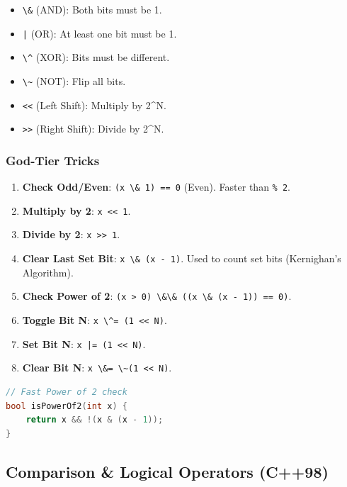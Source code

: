 \begin{itemize}
\tightlist
\item
  \passthrough{\lstinline!\&!} (AND): Both bits must be 1.
\item
  \passthrough{\lstinline!|!} (OR): At least one bit must be 1.
\item
  \passthrough{\lstinline!\^!} (XOR): Bits must be different.
\item
  \passthrough{\lstinline!\~!} (NOT): Flip all bits.
\item
  \passthrough{\lstinline!<<!} (Left Shift): Multiply by 2\^{}N.
\item
  \passthrough{\lstinline!>>!} (Right Shift): Divide by 2\^{}N.
\end{itemize}

\hypertarget{god-tier-tricks}{%
\subsubsection{God-Tier Tricks}\label{god-tier-tricks}}

\begin{enumerate}
\def\labelenumi{\arabic{enumi}.}
\tightlist
\item
  \textbf{Check Odd/Even}: \passthrough{\lstinline!(x \& 1) == 0!}
  (Even). Faster than \passthrough{\lstinline!\% 2!}.
\item
  \textbf{Multiply by 2}: \passthrough{\lstinline!x << 1!}.
\item
  \textbf{Divide by 2}: \passthrough{\lstinline!x >> 1!}.
\item
  \textbf{Clear Last Set Bit}: \passthrough{\lstinline!x \& (x - 1)!}.
  Used to count set bits (Kernighan's Algorithm).
\item
  \textbf{Check Power of 2}:
  \passthrough{\lstinline!(x > 0) \&\& ((x \& (x - 1)) == 0)!}.
\item
  \textbf{Toggle Bit N}: \passthrough{\lstinline!x \^= (1 << N)!}.
\item
  \textbf{Set Bit N}: \passthrough{\lstinline!x |= (1 << N)!}.
\item
  \textbf{Clear Bit N}: \passthrough{\lstinline!x \&= \~(1 << N)!}.
\end{enumerate}

\begin{lstlisting}[language={C++}]
// Fast Power of 2 check
bool isPowerOf2(int x) {
    return x && !(x & (x - 1));
}
\end{lstlisting}

\hypertarget{comparison-logical-operators-c98}{%
\subsection{Comparison \& Logical Operators
(C++98)}\label{comparison-logical-operators-c98}}

